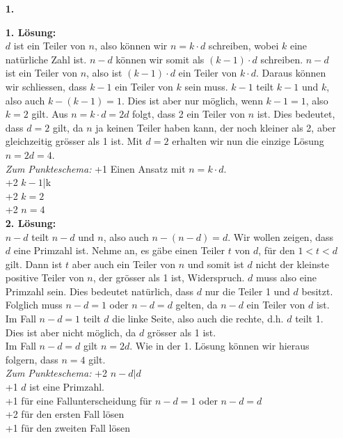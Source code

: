 \documentclass[12pt,a4paper]{article}
\theoremstyle{plain}
\theoremstyle{definition}
\theoremstyle{remark}
\begin{document}
\vspace{8mm}
\newpage
\begin{enumerate}


\item[\textbf{1.}]

\textbf{1. Lösung:}\\
$d$ ist ein Teiler von $n$, also können wir $n=k\cdot d$ schreiben, wobei $k$ eine natürliche Zahl ist. $n-d$ können wir somit als $(k-1)\cdot d$ schreiben. $n-d$ ist ein Teiler von $n$, also ist $(k-1)\cdot d$ ein Teiler von $k\cdot d$. Daraus können wir schliessen, dass $k-1$ ein Teiler von $k$ sein muss. $k-1$ teilt $k-1$ und $k$, also auch $k-(k-1)=1$. Dies ist aber nur möglich, wenn $k-1=1$, also $k=2$ gilt. Aus $n=k\cdot d=2d$ folgt, dass 2 ein Teiler von $n$ ist. Dies bedeutet, dass $d=2$ gilt, da $n$ ja keinen Teiler haben kann, der noch kleiner als 2, aber gleichzeitig grösser als 1 ist. Mit $d=2$ erhalten wir nun die einzige Lösung $n=2d=4$.\\

\emph{Zum Punkteschema:}
+1 Einen Ansatz mit $n=k\cdot d$.\\
+2 $k-1$|k\\
+2 $k=2$\\
+2 $n=4$\\

\textbf{2. Lösung:}\\
$n-d$ teilt $n-d$ und $n$, also auch $n-(n-d)=d$. Wir wollen zeigen, dass $d$ eine Primzahl ist. Nehme an, es gäbe einen Teiler $t$ von $d$, für den $1<t<d$ gilt. Dann ist $t$ aber auch ein Teiler von $n$ und somit ist $d$ nicht der kleinste positive Teiler von $n$, der grösser als 1 ist, Widerspruch. $d$ muss also eine Primzahl sein. Dies bedeutet natürlich, dass $d$ nur die Teiler 1 und $d$ besitzt. Folglich muss $n-d=1$ oder $n-d=d$ gelten, da $n-d$ ein Teiler von $d$ ist.\\
Im Fall $n-d=1$ teilt $d$ die linke Seite, also auch die rechte, d.h. $d$ teilt 1. Dies ist aber nicht möglich, da $d$ grösser als 1 ist.\\
Im Fall $n-d=d$ gilt $n=2d$. Wie in der 1. Lösung können wir hieraus folgern, dass $n=4$ gilt.\\

\emph{Zum Punkteschema:}
+2 $n-d|d$\\
+1 $d$ ist eine Primzahl.\\
+1 für eine Fallunterscheidung für $n-d=1$ oder $n-d=d$\\
+2 für den ersten Fall lösen\\
+1 für den zweiten Fall lösen\\


\end{enumerate}
\end{document}
